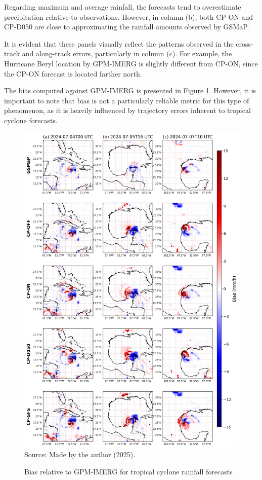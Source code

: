 Regarding maximum and average rainfall, the forecasts tend to overestimate precipitation relative to observations. However, in column (b), both CP-ON and CP-D050 are close to approximating the rainfall amounts observed by GSMaP.

It is evident that these panels visually reflect the patterns observed in the cross-track and along-track errors, particularly in column (c). For example, the Hurricane Beryl location by GPM-IMERG is slightly different from CP-ON, since the CP-ON forecast is located farther north.

The bias computed against GPM-IMERG is presented in Figure \ref{fig:biasgpm}. However, it is important to note that bias is not a particularly reliable metric for this type of phenomenon, as it is heavily influenced by trajectory errors inherent to tropical cyclone forecasts.

\begin{figure}[!ht]
	\centering
	\caption{Bias relative to GPM-IMERG for tropical cyclone rainfall forecasts} %
	\includegraphics[width=\textwidth]{docs/figuras/chapter5/painel_bias_rainfall_selected_FINAL.png} 
	\vspace{0.5em}
	Source: Made by the author (2025).  %
	\label{fig:biasgpm} %
\end{figure}

